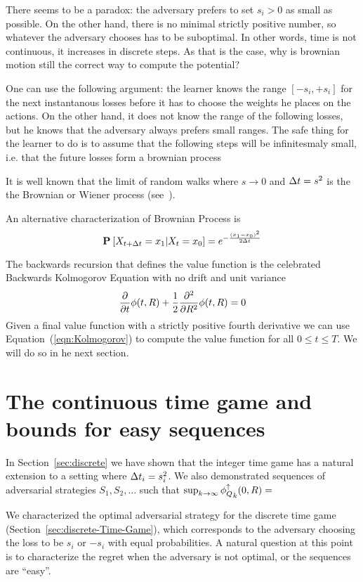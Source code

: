 \documentclass{article}[12pt]
\begin{document}
There seems to be a paradox: the adversary prefers to set $s_i>0$ as
small as possible. On the other hand, there is no minimal strictly
positive number, so whatever the adversary chooses has to be
suboptimal. In other words, time is not continuous, it increases in
discrete steps. As that is the case, why is brownian motion still
the correct way to compute the potential?

One can use the following argument: the learner knows the range
$[-s_i,+s_i]$ for the next instantanous losses before it has to choose
the weights he places on the actions. On the other hand, it does not
know the range of the following losses, but he knows that the
adversary always prefers small ranges. The safe thing for the learner
to do is to assume that the following steps will be infinitesmaly
small, i.e. that the future losses form a brownian process

It is well known that the limit of random walks where $s \to 0$ and
$\Delta t=s^2$ is the the Brownian or Wiener process
(see~\cite{kac1947random}).

An alternative characterization of Brownian Process is
$$ {\bf P}_{}\left[ X_{t+\Delta t}=x_1 | X_t=x_0 \right]=e^{-\frac{(x_1-x_0)^2}{2 \Delta t}}$$

The backwards recursion that
defines the value function is the celebrated Backwards Kolmogorov
Equation with no drift and unit variance
\begin{equation} \label{eqn:Kolmogorov}
  \frac{\partial}{\partial t} \phi(t,R)
  + \frac{1}{2} \frac{\partial^2}{\partial R^2} \phi(t,R)=0
\end{equation}
Given a final value function with a strictly positive fourth
derivative we can use Equation~(\ref{eqn:Kolmogorov}) to compute the
value function for all $0 \leq t \leq T$. We will do so in he next section.

\section{The continuous time game and bounds for easy
  sequences} \label{sec:easy}

In Section~\ref{sec:discrete} we have shown that the integer time game
has a natural extension to a setting where $\Delta t_i = s_i^2$. We
also demonstrated sequences of adversarial strategies $S_1,S_2,\ldots$
such that $\sup_{k \to \infty} {\phi_{Q}^{\uparrow}}_k(0,R) = $

We characterized the optimal adversarial strategy for the discrete
time game (Section~\ref{sec:discrete-Time-Game}), which corresponds
to the adversary choosing the loss to be $s_i$ or $-s_i$ with equal
probabilities. A natural question at this point is to characterize the
regret when the adversary is not optimal, or the sequences are ``easy''.
\end{document}
